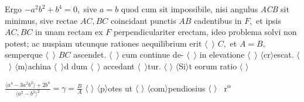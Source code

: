 Ergo 
$-a^2b^2 + b^4 = 0,$
sive $a=b$ quod cum sit impossibile, nisi angulus \textit{ACB} sit minimus, sive rectae $AC, BC$ coincidant punctis $AB$ cadentibus in $F,$ et ipsis $AC, BC$ in unam rectam ex $F$ perpendiculariter erectam, ideo problema\protect{} solvi non potest; ac nuspiam utcunque rationes aequilibrium\protect{} erit $\langle$\,\textendash\,\textendash\,$\rangle$ $C,$ et $A=B,$ semperque 
$\langle$\,\textendash\,\textendash\,$\rangle$
$BC$ ascendet. 
$\langle$\,\textendash\,\textendash\,$\rangle$
cum continue de-
$\langle$\,\textendash\,\textendash\,$\rangle$
in elevatione
$\langle$\,\textendash\,\textendash\,$\rangle$
$\langle$cr$\rangle$escat. 
$\langle$\,\textendash\,\textendash\,$\rangle$
$\langle$m$\rangle$achina\protect{}
$\langle$\,\textendash\,\textendash\,$\rangle$d
dum
$\langle$\,\textendash\,\textendash\,$\rangle$
accedant
$\langle$\,\textendash\,\textendash\,$\rangle$tur.
\pend
\pstart
$\langle$\,\textendash\,$\rangle$
$\langle$Si$\rangle$t eorum 
ratio 
$\langle$\,\textendash\,$\rangle$
\rule[-4mm]{0mm}{10mm}$\displaystyle\frac{\langle a^4 - 3a^2b^2\rangle + 2b^4}{\langle a^2 - b^2\rangle^2}=\gamma=\frac{B}{A}$
$\langle$\,\textendash\,$\rangle$ 
$\langle$p$\rangle$otes ut 
$\langle$\,\textendash\,$\rangle$
$\langle$com$\rangle$pendiosius
$\langle$\,\textendash\,$\rangle$ ~r\textsuperscript{o}\rbrack\ 
\pend
\count{}
\count{}
\count{}
